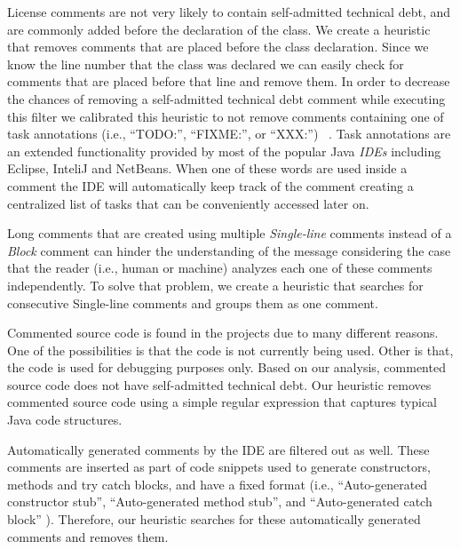 License comments are not very likely to contain self-admitted technical debt, and are commonly added before the declaration of the class. We create a heuristic that removes comments that are placed before the class declaration. Since we know the line number that the class was declared we can easily check for comments that are placed before that line and remove them. In order to decrease the chances of removing a self-admitted technical debt comment while executing this filter we calibrated this heuristic to not remove comments containing one of task annotations (i.e., ``TODO:'', ``FIXME:'', or ``XXX:'') ~\cite{Storey2008ICSE}. Task annotations are an extended functionality provided by most of the popular Java \textit{IDEs} including Eclipse, InteliJ and NetBeans. When one of these words are used inside a comment the IDE will automatically keep track of the comment creating a centralized list of tasks that can be conveniently accessed later on. 

Long comments that are created using multiple \emph{Single-line} comments instead of a \emph{Block} comment can hinder the understanding of the message considering the case that the reader (i.e., human or machine) analyzes each one of these comments independently. To solve that problem, we create a heuristic that searches for consecutive Single-line comments and groups them as one comment.
 
Commented source code is found in the projects due to many different reasons. One of the possibilities is that the code is not currently being used. Other is that, the code is used for debugging purposes only. Based on our analysis, commented source code does not have self-admitted technical debt. Our heuristic removes commented source code using a simple regular expression that captures typical Java code structures.

Automatically generated comments by the IDE are filtered out as well. These comments are inserted as part of code snippets used to generate constructors, methods and try catch blocks, and have a fixed format (i.e., ``Auto-generated constructor stub'', ``Auto-generated method stub'', and ``Auto-generated catch block'' ). Therefore, our heuristic searches for these automatically generated comments and removes them. 

